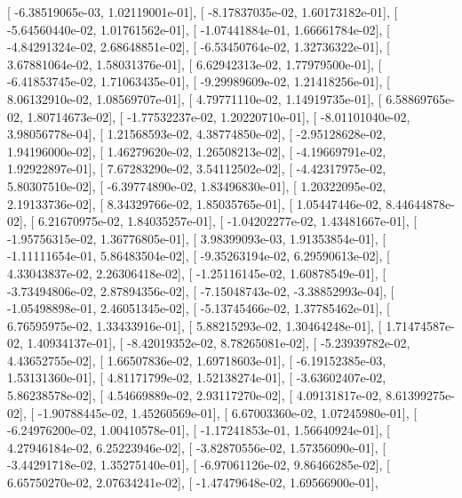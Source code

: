 \documentclass{article}
\begin{document}
       [ -6.38519065e-03,   1.02119001e-01],
       [ -8.17837035e-02,   1.60173182e-01],
       [ -5.64560440e-02,   1.01761562e-01],
       [ -1.07441884e-01,   1.66661784e-02],
       [ -4.84291324e-02,   2.68648851e-02],
       [ -6.53450764e-02,   1.32736322e-01],
       [  3.67881064e-02,   1.58031376e-01],
       [  6.62942313e-02,   1.77979500e-01],
       [ -6.41853745e-02,   1.71063435e-01],
       [ -9.29989609e-02,   1.21418256e-01],
       [  8.06132910e-02,   1.08569707e-01],
       [  4.79771110e-02,   1.14919735e-01],
       [  6.58869765e-02,   1.80714673e-02],
       [ -1.77532237e-02,   1.20220710e-01],
       [ -8.01101040e-02,   3.98056778e-04],
       [  1.21568593e-02,   4.38774850e-02],
       [ -2.95128628e-02,   1.94196000e-02],
       [  1.46279620e-02,   1.26508213e-02],
       [ -4.19669791e-02,   1.92922897e-01],
       [  7.67283290e-02,   3.54112502e-02],
       [ -4.42317975e-02,   5.80307510e-02],
       [ -6.39774890e-02,   1.83496830e-01],
       [  1.20322095e-02,   2.19133736e-02],
       [  8.34329766e-02,   1.85035765e-01],
       [  1.05447446e-02,   8.44644878e-02],
       [  6.21670975e-02,   1.84035257e-01],
       [ -1.04202277e-02,   1.43481667e-01],
       [ -1.95756315e-02,   1.36776805e-01],
       [  3.98399093e-03,   1.91353854e-01],
       [ -1.11111654e-01,   5.86483504e-02],
       [ -9.35263194e-02,   6.29590613e-02],
       [  4.33043837e-02,   2.26306418e-02],
       [ -1.25116145e-02,   1.60878549e-01],
       [ -3.73494806e-02,   2.87894356e-02],
       [ -7.15048743e-02,  -3.38852993e-04],
       [ -1.05498898e-01,   2.46051345e-02],
       [ -5.13745466e-02,   1.37785462e-01],
       [  6.76595975e-02,   1.33433916e-01],
       [  5.88215293e-02,   1.30464248e-01],
       [  1.71474587e-02,   1.40934137e-01],
       [ -8.42019352e-02,   8.78265081e-02],
       [ -5.23939782e-02,   4.43652755e-02],
       [  1.66507836e-02,   1.69718603e-01],
       [ -6.19152385e-03,   1.53131360e-01],
       [  4.81171799e-02,   1.52138274e-01],
       [ -3.63602407e-02,   5.86238578e-02],
       [  4.54669889e-02,   2.93117270e-02],
       [  4.09131817e-02,   8.61399275e-02],
       [ -1.90788445e-02,   1.45260569e-01],
       [  6.67003360e-02,   1.07245980e-01],
       [ -6.24976200e-02,   1.00410578e-01],
       [ -1.17241853e-01,   1.56640924e-01],
       [  4.27946184e-02,   6.25223946e-02],
       [ -3.82870556e-02,   1.57356090e-01],
       [ -3.44291718e-02,   1.35275140e-01],
       [ -6.97061126e-02,   9.86466285e-02],
       [  6.65750270e-02,   2.07634241e-02],
       [ -1.47479648e-02,   1.69566900e-01],
\end{document}
